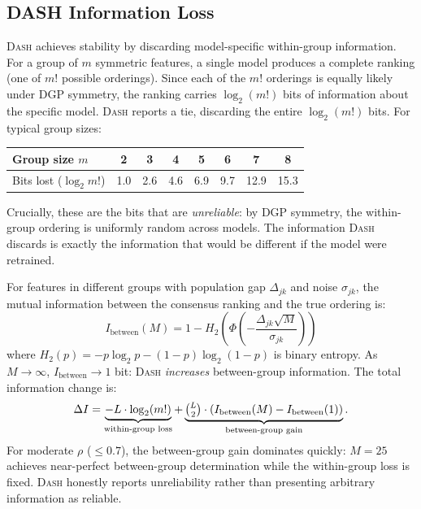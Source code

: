 \documentclass{article}
\newcommand{\DASH}{\textsc{Dash}}
\begin{document}
\subsection{DASH Information Loss}
\label{sec:info-loss}

\DASH{} achieves stability by discarding model-specific within-group information. For a group of $m$ symmetric features, a single model produces a complete ranking (one of $m!$ possible orderings). Since each of the $m!$ orderings is equally likely under DGP symmetry, the ranking carries $\log_2(m!)$ bits of information about the specific model. \DASH{} reports a tie, discarding the entire $\log_2(m!)$ bits. For typical group sizes:

\begin{center}
\small
\begin{tabular}{@{}lccccccc@{}}
\toprule
Group size $m$ & 2 & 3 & 4 & 5 & 6 & 7 & 8 \\
\midrule
Bits lost ($\log_2 m!$) & 1.0 & 2.6 & 4.6 & 6.9 & 9.7 & 12.9 & 15.3 \\
\bottomrule
\end{tabular}
\end{center}

Crucially, these are the bits that are \emph{unreliable}: by DGP symmetry, the within-group ordering is uniformly random across models. The information \DASH{} discards is exactly the information that would be different if the model were retrained.

For features in different groups with population gap $\Delta_{jk}$ and noise $\sigma_{jk}$, the mutual information between the consensus ranking and the true ordering is:
\[
    I_{\text{between}}(M) = 1 - H_2\!\left(\Phi\!\left(-\frac{\Delta_{jk}\sqrt{M}}{\sigma_{jk}}\right)\right)
\]
where $H_2(p) = -p\log_2 p - (1-p)\log_2(1-p)$ is binary entropy. As $M \to \infty$, $I_{\text{between}} \to 1$ bit: \DASH{} \emph{increases} between-group information. The total information change is:
\[
    \Delta I = \underbrace{-L \cdot \log_2(m!)}_{\text{within-group loss}} + \underbrace{\tbinom{L}{2} \cdot (I_{\text{between}}(M) - I_{\text{between}}(1))}_{\text{between-group gain}}.
\]
For moderate $\rho$ ($\leq 0.7$), the between-group gain dominates quickly: $M = 25$ achieves near-perfect between-group determination while the within-group loss is fixed. \DASH{} honestly reports unreliability rather than presenting arbitrary information as reliable.
\end{document}
